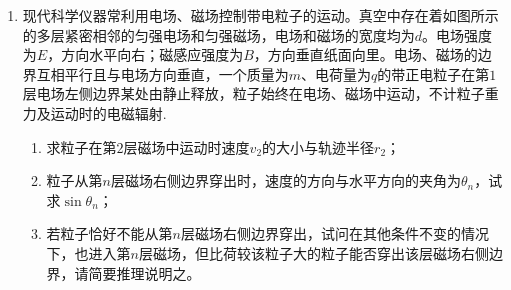 \begin{enumerate}[leftmargin=0em]


\newpage
\item
{}
现代科学仪器常利用电场、磁场控制带电粒子的运动。真空中存在着如图所示的多层紧密相邻的匀强电场和匀强磁场，电场和磁场的宽度均为$ d $。电场强度为$ E $，方向水平向右；磁感应强度为$ B $，方向垂直纸面向里。电场、磁场的边界互相平行且与电场方向垂直，一个质量为$ m $、电荷量为$ q $的带正电粒子在第$ 1 $层电场左侧边界某处由静止释放，粒子始终在电场、磁场中运动，不计粒子重力及运动时的电磁辐射.
\begin{enumerate}
\renewcommand{\labelenumi}{\arabic{enumi}.}
\item
求粒子在第$ 2 $层磁场中运动时速度$ v_{2} $的大小与轨迹半径$ r_{2} $；
\item 
粒子从第$ n $层磁场右侧边界穿出时，速度的方向与水平方向的夹角为$ \theta _n $，试求$ \sin \theta _n $；
\item 
若粒子恰好不能从第$ n $层磁场右侧边界穿出，试问在其他条件不变的情况下，也进入第$ n $层磁场，但比荷较该粒子大的粒子能否穿出该层磁场右侧边界，请简要推理说明之。




\end{enumerate}
\begin{figure}[h!]
\flushright

\end{figure}


\end{enumerate}
